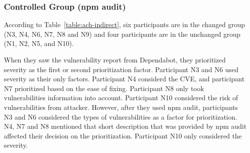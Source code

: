 \documentclass[conference]{IEEEtran}
\begin{document}
	
	
	\subsubsection{Controlled Group (npm audit)}
	According to Table~\ref{table:ach-indirect}, six participants are in the changed group (N3, N4, N6, N7, N8 and N9) and four participants are in the unchanged group (N1, N2, N5, and N10). 
	
	
	When they saw the vulnerability report from Dependabot, they prioritized severity as the first or second prioritization factor. Participant N3 and N6 used severity as their only factors. Participant N4 considerd the CVE, and participant N7 prioritized based on the ease of fixing. Participant N8 only took vulnerabilities information into account. Participant N10 considered the risk of vulnerabilities from attacker. However, after they used npm audit, participants N3 and N6 considered the types of vulnerabilities as a factor for prioritization. N4, N7 and N8 mentioned that short description that was provided by npm audit affected their decision on the prioritization. Participant N10 only considered the severity.
	
\end{document}

